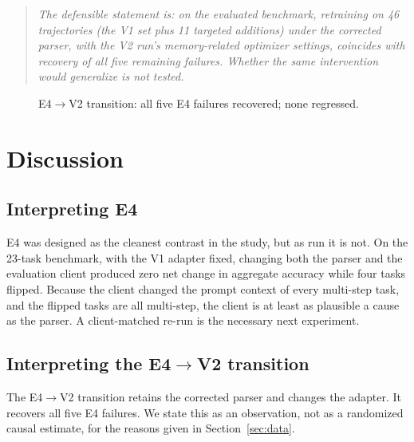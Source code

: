 \documentclass[10pt,twocolumn]{article}
\begin{document}
\begin{quote}
\itshape
The defensible statement is: on the evaluated benchmark, retraining on 46 trajectories (the V1 set plus 11 targeted additions) under the corrected parser, with the V2 run's memory-related optimizer settings, coincides with recovery of all five remaining failures. Whether the same intervention would generalize is not tested.
\end{quote}

\begin{figure}[t]
\centering
{}
\caption{E4$\to$V2 transition: all five E4 failures recovered; none regressed.}
\label{fig:decomp}
\end{figure}

\section{Discussion}
\label{sec:discussion}

\subsection{Interpreting E4}

E4 was designed as the cleanest contrast in the study, but as run it is not. On the 23-task benchmark, with the V1 adapter fixed, changing both the parser and the evaluation client produced zero net change in aggregate accuracy while four tasks flipped. Because the client changed the prompt context of every multi-step task, and the flipped tasks are all multi-step, the client is at least as plausible a cause as the parser. A client-matched re-run is the necessary next experiment.

\subsection{Interpreting the E4$\to$V2 transition}

The E4$\to$V2 transition retains the corrected parser and changes the adapter. It recovers all five E4 failures. We state this as an observation, not as a randomized causal estimate, for the reasons given in Section~\ref{sec:data}.
\end{document}
